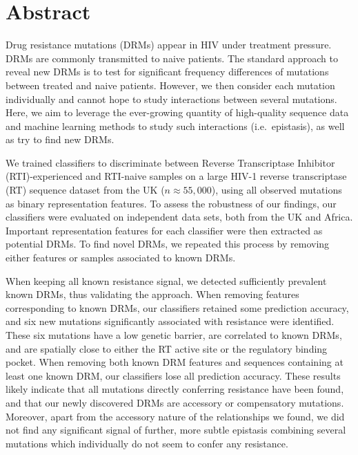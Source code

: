 \documentclass[
  11pt,
  twoside,
  BCOR=10mm,
  listof=totoc]{scrbook}
\begin{document}
\hypertarget{abstract-paper}{%
\section*{Abstract}\label{abstract-paper}}

Drug resistance mutations (DRMs) appear in HIV under treatment pressure.
DRMs are commonly transmitted to naive patients. The standard approach
to reveal new DRMs is to test for significant frequency differences of
mutations between treated and naive patients. However, we then consider
each mutation individually and cannot hope to study interactions between
several mutations. Here, we aim to leverage the ever-growing quantity of
high-quality sequence data and machine learning methods to study such
interactions (i.e.~epistasis), as well as try to find new DRMs.

We trained classifiers to discriminate between Reverse Transcriptase
Inhibitor (RTI)-experienced and RTI-naive samples on a large HIV-1
reverse transcriptase (RT) sequence dataset from the UK
(\(n\approx 55,000\)), using all observed mutations as binary
representation features. To assess the robustness of our findings, our
classifiers were evaluated on independent data sets, both from the UK
and Africa. Important representation features for each classifier were
then extracted as potential DRMs. To find novel DRMs, we repeated this
process by removing either features or samples associated to known
DRMs.

When keeping all known resistance signal, we detected sufficiently
prevalent known DRMs, thus validating the approach. When removing
features corresponding to known DRMs, our classifiers retained some
prediction accuracy, and six new mutations significantly associated with
resistance were identified. These six mutations have a low genetic
barrier, are correlated to known DRMs, and are spatially close to either
the RT active site or the regulatory binding pocket. When removing both
known DRM features and sequences containing at least one known DRM, our
classifiers lose all prediction accuracy. These results likely indicate
that all mutations directly conferring resistance have been found, and
that our newly discovered DRMs are accessory or compensatory mutations.
Moreover, apart from the accessory nature of the relationships we found,
we did not find any significant signal of further, more subtle epistasis
combining several mutations which individually do not seem to confer any
resistance.
\end{document}
